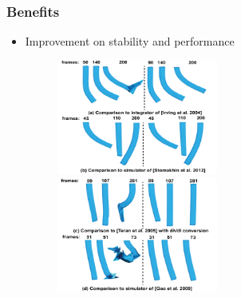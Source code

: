 \documentclass[serif,mathserif]{beamer}
\begin{document}
\begin{frame}
  \frametitle{Benefits}
  \begin{itemize}
  \item Improvement on stability and performance
    \begin{figure}
    \centering
    \includegraphics[width=0.5\textwidth]{img/svdgradbenefitAB}
    \includegraphics[width=0.5\textwidth]{img/svdgradbenefitCD}
  \end{figure}
  \end{itemize}
\end{frame}
\end{document}
